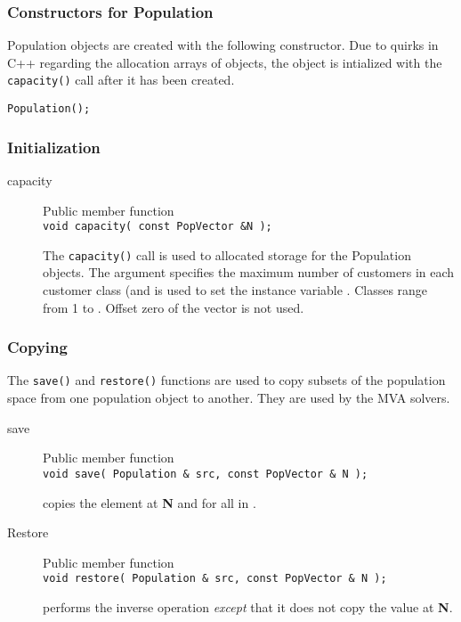 \subsubsection{Constructors for Population}

Population objects are created with the following constructor.  Due to
quirks in C++ regarding the allocation arrays of objects, the object
is intialized with the \texttt{capacity()} call after it has been
created.

\texttt{Population();}

\subsubsection{Initialization}

\begin{description}
\item[capacity] \texonly{---} Public member function\\
  \label{sec:population-capacity}
  \texttt{void capacity( const PopVector \&N );}

  The \texttt{capacity()} call is used to allocated storage for the
  Population objects.  The argument  specifies the maximum number
  of customers in each customer class (and is used to set the instance
  variable .  Classes range
  from 1 to .  Offset zero of
  the vector  is not used.
\end{description}


\subsubsection{Copying}
\label{sec:population-copy}

The \texttt{save()} and \texttt{restore()} functions are used to copy
subsets of the population space from one population object to another.
They are used by the  MVA solvers.
\begin{description}

\item[save] \texonly{---} Public member function\\
  \texttt{void save( Population \& src, const PopVector \& N );}

   copies the element at {\bf N} and 
  for all  in .

\item[Restore] \texonly{---} Public member function\\
  \texttt{void restore( Population \& src, const PopVector \& N );}

   performs the inverse operation \emph{except} that it
  does not copy the value at {\bf N}.

\end{description}

